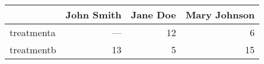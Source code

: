 \begin{tabular}{lrrr}
  \toprule
  & John Smith & Jane Doe & Mary Johnson \\ 
  \midrule
  treatmenta & --- &  12 &   6 \\ 
  treatmentb &  13 &   5 &  15 \\ 
   \bottomrule
\end{tabular}
